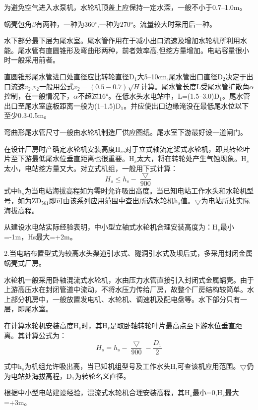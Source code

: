 \documentclass{ctexbook}
\begin{document}
为避免空气进入水泵机，水轮机顶盖上应保持一定水深，一般不小于0.7--1.0m。

蜗壳包角$\beta$有两种，一种为360$^\circ$,一种为270°。流量较大时采用后一种。

水下部分最下层为尾水室。尾水管作用在于减小出口流速及增加水轮机所利用水能。尾水管有直圆锥形及弯曲形两种，前者效率高,但挖方量增加。电站容量很小时一般采用前者。

直圆锥形尾水管进口处直径应比转轮直径D$_1$大5--10cm,尾水管出口直径D$_2$决定于出口流速$v_2$,$v_2$一般用公式$v_2=(0.5-0.7)\sqrt{H}$计算。尾水管长度L受尾水管扩散角$\alpha$控制，在一般情况下，$\alpha$不超过16°。在低水头水电站中，L=(1.5--3.0)D$_1$。尾水管出口至尾水室底板距离一般为(1--1.5)D$_1$。并应使出口边缘淹没在最低尾水位以下至少0.3-0.5m。

弯曲形尾水管尺寸一般由水轮机制造厂供应图纸。尾水室下游最好设一道闸门。

在设计厂房时产确定水轮机安装高度H$_s$,对于立式轴流定桨式水轮机，即其转轮叶片至下游最低尾水位垂直距离也很重要。H$_s$太大，将在转轮处产生气蚀现象。H$_s$太小，电站挖方量又大。对立式机组，一般用下式计算：
\begin{equation*}
	H_s \leqslant h_s -\frac{\bigtriangledown}{900}
\end{equation*}
式中h$_s$为当电站海拔高程如为零时允许吸出高度。当已知电站工作水头和水轮机型号，如为ZD$_561$即可由该系列应用范围中查出所选水轮机h$_s$值。$\bigtriangledown$为电站所处实际海拔高程。

从建设水电站实际经验表明，中小型立轴式水轮机合理安装高度为：H$_s$最小=-1m，Hs最大=+2m。

2.当电站布置型式为较高水头渠道引水式、隧洞引水式及坝后式，多采用封闭金属蜗壳式厂房。

水轮机一般采用卧轴混流式水轮机，水由压力水管直接引入封闭式金属蜗壳。由于上游高压水在封闭管道中流动，不将水压力传给厂房，故整个厂房结构较简单。水上部分机房中，一般放置发电机、水轮机、调速机及配电盘等。水下部分只有一层，即尾水室。

在计算水轮机安装高度H$_s$时，其H$_s$是取卧轴转轮叶片最高点至下游水位垂直距离。其计算公式为：
\begin{equation*}
	H_s=h_s-\frac{\bigtriangledown}{900}-\frac{D_1}{2}
\end{equation*}

式中h$_s$为机组允许吸出高，当已知机组型号及工作水头H,可查该机应用范围。$\bigtriangledown$仍为电站处海拔高程，D$_1$为转轮名义直径。

根据中小型电站建设经验，混流式水轮机合理安装高程，其H$_s$最小=0,H$_s$最大=+3m。
\end{document}
